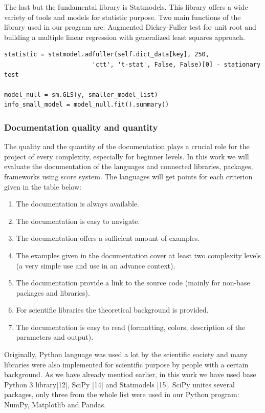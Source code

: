 \documentclass{article}
\begin{document}
The last but the fundamental library is Statmodels. This library offers a wide variety of tools and models for statistic purpose. Two main functions of the library used in our program are: Augmented Dickey-Fuller test for unit root and building a multiple linear regression with generalized least squares approach.
\begin{verbatim}
statistic = statmodel.adfuller(self.dict_data[key], 250, 
                        'ctt', 't-stat', False, False)[0] - stationary test
                        
model_null = sm.GLS(y, smaller_model_list)
info_small_model = model_null.fit().summary()
\end{verbatim}   

\subsubsection{Documentation quality and quantity}
The quality and the quantity of the documentation plays a crucial role for the project of every complexity, especially for beginner levels. In this work we will evaluate the documentation of the languages and connected libraries, packages, frameworks using score system. The languages will get points for each criterion given in the table below:
\begin{enumerate}
    \item The documentation is always available.
    \item The documentation is easy to navigate.
    \item The documentation offers a sufficient amount of examples.
    \item The examples given in the documentation cover at least two complexity levels (a very simple use and use in an advance context).
    \item The documentation provide a link to the source code (mainly for non-base packages and libraries).
    \item For scientific libraries the theoretical background is provided.
    \item The documentation is easy to read (formatting, colors, description of the parameters and output).
\end{enumerate}
Originally, Python language was used a lot by the scientific society and many libraries were also implemented for scientific purpose by people with a certain background. As we have already mentiod earlier, in this work we have used base Python 3 library[12],  SciPy [14] and Statmodels [15]. SciPy unites several packages, only three from the whole list were used in our Python program: NumPy, Matplotlib and Pandas.\\
\end{document}
